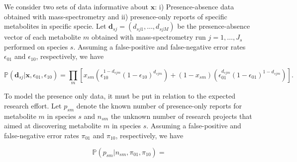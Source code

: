 \documentclass[a4paper,10pt]{article}
\def\P{\mathbb{P}}
\def\x{\boldsymbol{x}}
\def\d{\boldsymbol{d}}
\begin{document}
We consider two sets of data informative about $\x$: i) Presence-absence data obtained with mass-spectrometry and ii) presence-only reports of specific metabolites in specific specie. Let $\d_{sj}=(d_{sj1}, \ldots, d_{sjM})$ be the presence-absence vector of each metabolite $m$ obtained with mass-spectrometry run $j=1,\ldots,J_s$ performed on species $s$. Assuming a false-positive and false-negative error rates $\epsilon_{01}$ and $\epsilon_{10}$, respectively, we have

\begin{equation*}
 \P(\d_{sj}|\x, \epsilon_{01}, \epsilon_{10}) = \prod_m \left[ x_{sm}\left(\epsilon_{10}^{1-d_{sjm}}(1-\epsilon_{10})^{d_{sjm}}\right) + (1-x_{sm})\left( \epsilon_{01}^{d_{sjm}}(1-\epsilon_{01})^{1-d_{sjm}}\right)\right].
\end{equation*}

To model the presence only data, it must be put in relation to the expected research effort. Let $p_{sm}$ denote the known number of presence-only reports for metabolite $m$ in species $s$ and $n_{sm}$ the unknown number of research projects that aimed at discovering metabolite $m$ in species $s$. Assuming a false-positive and false-negative error rates $\pi_{01}$ and $\pi_{10}$, respectively, we have

\begin{equation*}
 \P(p_{sm}|n_{sm}, \pi_{01}, \pi_{10}) = 
\end{equation*}
\end{document}
